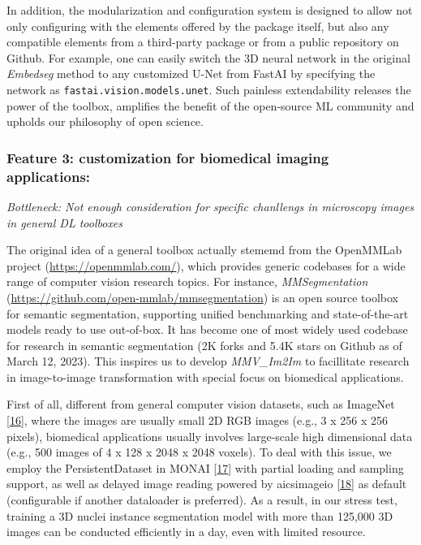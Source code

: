 In addition, the modularization and configuration system is designed to allow not only configuring with the elements offered by the package itself, but also any compatible elements from a third-party package or from a public repository on Github.
For example, one can easily switch the 3D neural network in the original \emph{Embedseg} method to any customized U-Net from FastAI by specifying the network as \texttt{fastai.vision.models.unet}. Such painless extendability releases the power of the toolbox, amplifies the benefit of the open-source ML community and upholds our philosophy of open science.

\hypertarget{feature-3-customization-for-biomedical-imaging-applications}{%
\subsubsection{Feature 3: customization for biomedical imaging applications:}\label{feature-3-customization-for-biomedical-imaging-applications}}

\emph{Bottleneck: Not enough consideration for specific chanllengs in microscopy images in general DL toolboxes}

The original idea of a general toolbox actually stememd from the OpenMMLab project (\url{https://openmmlab.com/}), which provides generic codebases for a wide range of computer vision research topics. For instance, \emph{MMSegmentation} (\url{https://github.com/open-mmlab/mmsegmentation}) is an open source toolbox for semantic segmentation, supporting unified benchmarking and state-of-the-art models ready to use out-of-box.
It has become one of most widely used codebase for research in semantic segmentation (2K forks and 5.4K stars on Github as of March 12, 2023).
This inspires us to develop \emph{MMV\_Im2Im} to facillitate research in image-to-image transformation with special focus on biomedical applications.

First of all, different from general computer vision datasets, such as ImageNet {[}\protect\hyperlink{ref-lt4BNUoG}{16}{]}, where the images are usually small 2D RGB images (e.g., 3 x 256 x 256 pixels), biomedical applications usually involves large-scale high dimensional data (e.g., 500 images of 4 x 128 x 2048 x 2048 voxels). To deal with this issue, we employ the PersistentDataset in MONAI {[}\protect\hyperlink{ref-UU62HYC6}{17}{]} with partial loading and sampling support, as well as delayed image reading powered by aicsimageio {[}\protect\hyperlink{ref-ONdyoUIo}{18}{]} as default (configurable if another dataloader is preferred).
As a result, in our stress test, training a 3D nuclei instance segmentation model with more than 125,000 3D images can be conducted efficiently in a day, even with limited resource.

